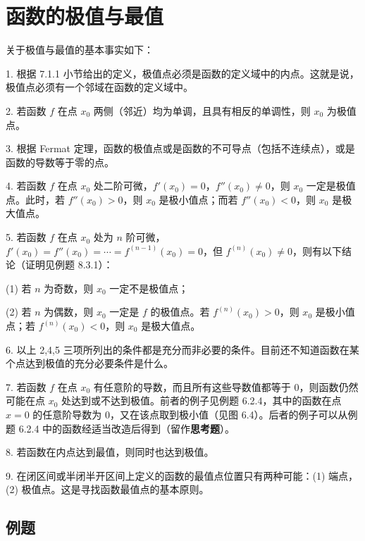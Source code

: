 \section{函数的极值与最值}

关于极值与最值的基本事实如下：

1. 根据 7.1.1 小节给出的定义，极值点必须是函数的定义域中的内点。这就是说，极值点必须有一个邻域在函数的定义域中。

2. 若函数 $f$ 在点 $x_0$ 两侧（邻近）均为单调，且具有相反的单调性，则 $x_0$ 为极值点。

3. 根据 Fermat 定理，函数的极值点或是函数的不可导点（包括不连续点），或是函数的导数等于零的点。

4. 若函数 $f$ 在点 $x_0$ 处二阶可微，$f'(x_0)=0$，$f''(x_0)\ne0$，则 $x_0$ 一定是极值点。此时，若 $f''(x_0)>0$，则 $x_0$ 是极小值点；而若 $f''(x_0)<0$，则 $x_0$ 是极大值点。

5. 若函数 $f$ 在点 $x_0$ 处为 $n$ 阶可微，$f'(x_0)=f''(x_0)=\cdots=f^{(n-1)}(x_0)=0$，但 $f^{(n)}(x_0)\ne0$，则有以下结论（证明见例题 8.3.1）：

(1) 若 $n$ 为奇数，则 $x_0$ 一定不是极值点；

(2) 若 $n$ 为偶数，则 $x_0$ 一定是 $f$ 的极值点。若 $f^{(n)}(x_0)>0$，则 $x_0$ 是极小值点；若 $f^{(n)}(x_0)<0$，则 $x_0$ 是极大值点。

6. 以上 2,4,5 三项所列出的条件都是充分而非必要的条件。目前还不知道函数在某个点达到极值的充分必要条件是什么。

7. 若函数 $f$ 在点 $x_0$ 有任意阶的导数，而且所有这些导数值都等于 0，则函数仍然可能在点 $x_0$ 处达到或不达到极值。前者的例子见例题 6.2.4，其中的函数在点 $x=0$ 的任意阶导数为 0，又在该点取到极小值（见图 6.4）。后者的例子可以从例题 6.2.4 中的函数经适当改造后得到（留作\textbf{思考题}）。

8. 若函数在内点达到最值，则同时也达到极值。

9. 在闭区间或半闭半开区间上定义的函数的最值点位置只有两种可能：(1) 端点，(2) 极值点。这是寻找函数最值点的基本原则。

\subsection{例题}

